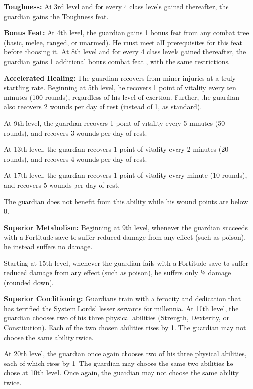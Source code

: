 \textbf{Toughness:} At 3rd level and for every 4 class levels gained thereafter, the guardian gains the Toughness feat.

\textbf{Bonus Feat:} At 4th level, the guardian gains 1 bonus feat from any combat tree (basic, melee, ranged, or unarmed). He must meet alI prerequisites for this feat before choosing it.
At 8th level and for every 4 class levels gained thereafter, the guardian gains 1 additional bonus combat feat , with the same restrictions.

\textbf{Accelerated Healing:} The guardian recovers from minor injuries at a truly start!ing rate. Beginning at 5th level, he recovers 1 point of vitality every ten minutes (100 rounds), regardless of his level of exertion. Further, the guardian also recovers 2 wounds per day of rest (instead of 1, as standard).

At 9th level, the guardian recovers 1 point of vitality every 5 minutes (50 rounds), and recovers 3 wounds per day of rest.

At 13th level, the guardian recovers 1 point of vitality every 2 minutes (20 rounds), and recovers 4 wounds per day of rest.

At 17th level, the guardian recovers 1 point of vitality every minute (10 rounds), and recovers 5 wounds per day of rest.

The guardian does not benefit from this ability while his wound points are below 0.

\textbf{Superior Metabolism:} Beginning at 9th level, whenever the guardian succeeds with a Fortitude save to suffer reduced damage from any effect (such as poison), he instead suffers no damage.

Starting at 15th level, whenever the guardian fails with a Fortitude save to suffer reduced damage from any effect (such as poison), he suffers only ½ damage (rounded down).

\textbf{Superior Conditioning:} Guardians train with a ferocity and dedication that has terrified the System Lords' lesser servants for millennia. At 10th level, the guardian chooses two of his three physical abilities (Strength, Dexterity, or Constitution). Each of the two chosen abilities rises by 1. The guardian may not choose the same ability twice.

At 20th level, the guardian once again chooses two of his three physical abilities, each of which rises by 1. The guardian may choose the same two abilities he chose at 10th level. Once again, the guardian may not choose the same ability twice.

